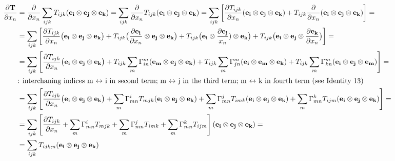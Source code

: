 \documentclass[11pt]{article}
\begin{document}
\begin{landscape}
\begin{align}
\frac{\partial {\bf{T}}}{\partial x_n} & = \frac{\partial}{\partial x_n} \sum_{ijk} T_{ijk} ({\bf{e_i}} \otimes {\bf{e_j}} \otimes {\bf{e_k}}) = \sum_{ijk} \frac{\partial}{\partial x_n} T_{ijk} ({\bf{e_i}} \otimes {\bf{e_j}} \otimes {\bf{e_k}}) = \sum_{ijk} \left[ \frac{\partial T_{ijk}}{\partial x_n} ({\bf{e_i}} \otimes {\bf{e_j}} \otimes {\bf{e_k}}) + T_{ijk} \frac{\partial}{\partial x_n}({\bf{e_i}} \otimes {\bf{e_j}} \otimes {\bf{e_k}})  \right] = \nonumber \\
& = \sum_{ijk} \left[ \frac{\partial T_{ijk}}{\partial x_n} \big( {\bf{e_i}} \otimes {\bf{e_j}} \otimes {\bf{e_k}} \big) + T_{ijk} \big( \frac{\partial {\bf{e_i}}}{\partial x_n} \otimes {\bf{e_j}} \otimes {\bf{e_k}} \big) + T_{ijk} \big( {\bf{e_i}} \otimes \frac{\partial {\bf{e_j}}}{x_n}) \otimes {\bf{e_k}} \big) + T_{ijk} \big( {\bf{e_i}} \otimes {\bf{e_j}} \otimes \frac{\partial {\bf{e_k}}}{\partial x_n} \big)  \right] = \nonumber \\
& = \sum_{ijk} \left[ \frac{\partial T_{ijk}}{\partial x_n} \big( {\bf{e_i}} \otimes {\bf{e_j}} \otimes {\bf{e_k}} \big) + T_{ijk} \sum_m \Gamma_{in}^m ({\bf{e_m}} \otimes {\bf{e_j}} \otimes {\bf{e_k}}) + T_{ijk} \sum_m \Gamma_{jn}^m ({\bf{e_i}} \otimes {\bf{e_m}} \otimes {\bf{e_k}}) + T_{ijk} \sum_m \Gamma_{kn}^m ({\bf{e_i}} \otimes {\bf{e_j}} \otimes {\bf{e_m}})  \right] = \nonumber \\
& \mbox{: interchaning indices m $\leftrightarrow$ i in second term; m $\leftrightarrow$ j in the third term; m $\leftrightarrow$ k in fourth term (see Identity 13)} \nonumber \\
& = \sum_{ijk} \left[ \frac{\partial T_{ijk}}{\partial x_n} \big( {\bf{e_i}} \otimes {\bf{e_j}} \otimes {\bf{e_k}} \big) + \sum_m \Gamma_{mn}^i T_{mjk} ({\bf{e_i}} \otimes {\bf{e_j}} \otimes {\bf{e_k}}) + \sum_m \Gamma_{mn}^j T_{imk} ({\bf{e_i}} \otimes {\bf{e_j}} \otimes {\bf{e_k}}) + \sum_m \Gamma_{mn}^k T_{ijm} ({\bf{e_i}} \otimes {\bf{e_j}} \otimes {\bf{e_k}})  \right] = \nonumber \\
& = \sum_{ijk} \left[\frac{\partial T_{ijk}}{\partial x_n} + \sum_m \Gamma_{mn}^i T_{mjk} + \sum_m \Gamma_{mn}^j T_{imk} + \sum_m \Gamma_{mn}^k T_{ijm} \right]({\bf{e_i}} \otimes {\bf{e_j}} \otimes {\bf{e_k}}) = \nonumber \\ 
& = \sum_{ijk} T_{ijk;n} ({\bf{e_i}} \otimes {\bf{e_j}} \otimes {\bf{e_k}})
\end{align}

\newpage 


\end{landscape}
\end{document}
